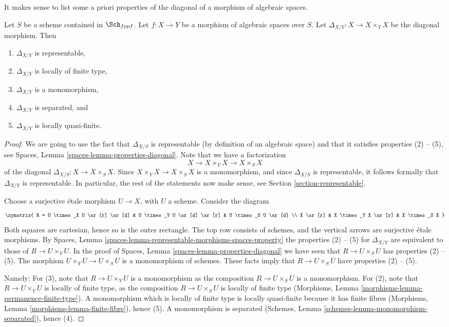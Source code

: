 \noindent
It makes sense to list some a priori properties of the diagonal of
a morphism of algebraic spaces.

\begin{lemma}
\label{lemma-properties-diagonal}
Let $S$ be a scheme contained in $\Sch_{fppf}$.
Let $f : X \to Y$ be a morphism of algebraic spaces over $S$.
Let $\Delta_{X/Y} : X \to X \times_Y X$ be the diagonal morphism.
Then
\begin{enumerate}
\item $\Delta_{X/Y}$ is representable,
\item $\Delta_{X/Y}$ is locally of finite type,
\item $\Delta_{X/Y}$ is a monomorphism,
\item $\Delta_{X/Y}$ is separated, and
\item $\Delta_{X/Y}$ is locally quasi-finite.
\end{enumerate}
\end{lemma}

\begin{proof}
We are going to use the fact that $\Delta_{X/S}$ is
representable (by definition of an algebraic space) and that
it satisfies properties (2) -- (5), see
Spaces, Lemma \ref{spaces-lemma-properties-diagonal}.
Note that we have a factorization
$$
X
\longrightarrow
X \times_Y X
\longrightarrow
X \times_S X
$$
of the diagonal $\Delta_{X/S} : X \to X \times_S X$. Since
$X \times_Y X \to X \times_S X$ is a monomorphism, and since
$\Delta_{X/S}$ is representable, it follows formally that
$\Delta_{X/Y}$ is representable. In particular, the rest of
the statements now make sense, see
Section \ref{section-representable}.

\medskip\noindent
Choose a surjective \'etale morphism $U \to X$, with $U$ a scheme.
Consider the diagram
$$
\xymatrix{
R = U \times_X U \ar[r] \ar[d] &
U \times_Y U \ar[d] \ar[r] &
U \times_S U \ar[d] \\
X \ar[r] & X \times_Y X \ar[r] & X \times_S X
}
$$
Both squares are cartesian, hence so is the outer rectangle.
The top row consists of schemes, and the vertical arrows
are surjective \'etale morphisms. By
Spaces, Lemma \ref{spaces-lemma-representable-morphisms-spaces-property}
the properties (2) -- (5) for $\Delta_{X/Y}$ are equivalent to those of
$R \to U \times_Y U$. In the proof of
Spaces, Lemma \ref{spaces-lemma-properties-diagonal}
we have seen that $R \to U \times_S U$ has properties (2) -- (5).
The morphism $U \times_Y U \to U \times_S U$ is a monomorphism
of schemes. These facts imply that $R \to U \times_S U$ have
properties (2) -- (5).

\medskip\noindent
Namely: For (3), note that $R \to U \times_Y U$
is a monomorphism as the composition
$R \to U \times_S U$ is a monomorphism. For (2), note that
$R \to U \times_Y U$ is locally of finite type, as the
composition $R \to U \times_S U$ is locally of finite type
(Morphisms, Lemma \ref{morphisms-lemma-permanence-finite-type}).
A monomorphism which is locally of finite type is locally quasi-finite
because it has finite fibres
(Morphisms, Lemma \ref{morphisms-lemma-finite-fibre}), hence (5).
A monomorphism is separated
(Schemes, Lemma \ref{schemes-lemma-monomorphism-separated}), hence (4).
\end{proof}

